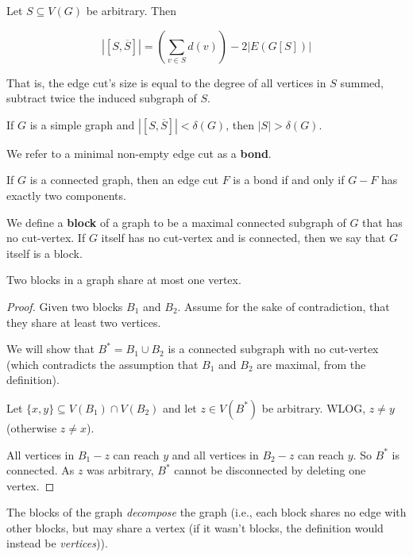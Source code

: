\documentclass{Book}
\begin{document}
\begin{proposition}
	Let $S \subseteq V(G)$ be arbitrary. Then

	\begin{equation*}
		|[S, \overline{S}]| = \left( \sum_{v \in S} d(v) \right) - 2|E(G[S])|
	\end{equation*}
\end{proposition}

That is, the edge cut's size is equal to the degree of all vertices in $S$ summed, subtract twice the induced subgraph of $S$.

\begin{corollary}
	If $G$ is a simple graph and $|[S, \overline{S}]| < \delta(G)$, then $|S| > \delta(G)$.
\end{corollary}


We refer to a minimal non-empty edge cut as a \textbf{bond}.

\begin{proposition}
	If $G$ is a connected graph, then an edge cut $F$ is a bond if and only if $G-F$ has exactly two components.
\end{proposition}

We define a \textbf{block} of a graph to be a maximal connected subgraph of $G$ that has no cut-vertex. If $G$ itself has no cut-vertex and is connected, then we say that $G$ itself is a block.

\begin{proposition}
	Two blocks in a graph share at most one vertex.
\end{proposition}

\begin{proof}
	Given two blocks $B_{1}$ and $B_{2}$. Assume for the sake of contradiction, that they share at least two vertices.

	We will show that $B^{*} = B_{1} \cup B_{2}$ is a connected subgraph with no cut-vertex (which contradicts the assumption that $B_{1}$ and $B_{2}$ are maximal, from the definition).

	Let $\{x,y\} \subseteq V(B_{1}) \cap V(B_{2})$ and let $z \in V(B^{*})$ be arbitrary. WLOG, $z \ne y$ (otherwise $z \ne x$).

	All vertices in $B_{1}-z$ can reach $y$ and all vertices in $B_{2}-z$ can reach $y$. So $B^{*}$ is connected. As $z$ was arbitrary, $B^{*}$ cannot be disconnected by deleting one vertex.
\end{proof}

The blocks of the graph \textit{decompose} the graph (i.e., each block shares no edge with other blocks, but may share a vertex (if it wasn't blocks, the definition would instead be \textit{vertices})).
\end{document}
